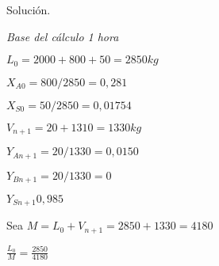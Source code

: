 \documentclass[12pt]{article}
\begin{document}
Solución.

\textit{Base del cálculo 1 hora}

$L_0=2000+800+50 = 2850kg$

$X_{A0}=800/2850=0,281$

$X_{S0}=50/2850=0,01754$

$V_{n+1}=20+1310=1330 kg$

$Y_{A n+1}=20/1330=0,0150$

$Y_{B n+1}=20/1330=0$

$Y_{S n+1}0,985$

Sea $M = L_0+V_{n+1}=2850+1330 =4180$

$\frac{L_0}{M} = \frac{2850}{4180}$
\end{document}
